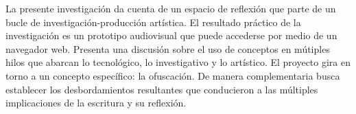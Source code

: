 La presente investigación da cuenta de un espacio de reflexión que parte de un bucle de investigación-producción artística. El resultado práctico de la investigación es un prototipo audiovisual que puede accederse por medio de un navegador web.
Presenta una discusión sobre el uso de conceptos en mútiples hilos que abarcan lo tecnológico, lo investigativo y lo artístico. El proyecto gira en torno a un concepto específico: la ofuscación. De manera complementaria busca establecer los desbordamientos resultantes que conducieron a las múltiples implicaciones de la escritura y su reflexión. 

